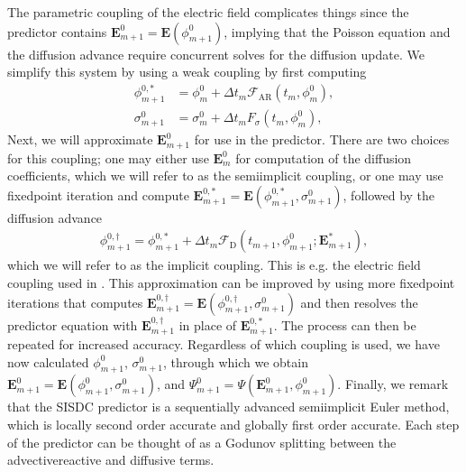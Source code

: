 \documentclass[letterpaper,10pt,english]{sphinxmanual}
\begin{document}
The parametric coupling of the electric field complicates things since the predictor contains \(\mathbf{E}_{m+1}^0 = \mathbf{E}\left(\phi_{m+1}^0\right)\), implying that the Poisson equation and the diffusion advance require concurrent solves for the diffusion update. We simplify this system by using a weak coupling by first computing
\begin{align}
\phi_{m+1}^{0,\ast} &= \phi_m^0 + \Delta t_m\mathcal{F}_{\textrm{AR}}\left(t_m, \phi_m^0\right), \\
\sigma_{m+1}^0 &= \sigma_m^0 + \Delta t_mF_\sigma\left(t_m, \phi_m^0\right),
\end{align}
Next, we will approximate \(\mathbf{E}_{m+1}^{0}\) for use in the predictor. There are two choices for this coupling; one may either use \(\mathbf{E}_m^0\) for computation of the diffusion coefficients, which we will refer to as the semi\sphinxhyphen{}implicit coupling, or one may use fixed\sphinxhyphen{}point iteration and compute \(\mathbf{E}_{m+1}^{0,\ast} = \mathbf{E}\left(\phi_{m+1}^{0, \ast}, \sigma_{m+1}^0\right)\), followed by the diffusion advance
\begin{equation*}
\begin{split}\phi_{m+1}^{0,\dagger} = \phi_{m+1}^{0,\ast} + \Delta t_m\mathcal{F}_{\textrm{D}}\left(t_{m+1}, \phi_{m+1}^0; \mathbf{E}_{m+1}^\ast\right),\end{split}
\end{equation*}
which we will refer to as the implicit coupling. This is e.g. the electric field coupling used in . This approximation can be improved by using more fixed\sphinxhyphen{}point iterations that computes \(\mathbf{E}_{m+1}^{0,\dagger} = \mathbf{E}\left(\phi_{m+1}^{0,\dagger}, \sigma_{m+1}^0\right)\) and then re\sphinxhyphen{}solves the predictor equation with \(\mathbf{E}_{m+1}^{0,\dagger}\) in place of \(\mathbf{E}_{m+1}^{0,\ast}\). The process can then be repeated for increased accuracy. Regardless of which coupling is used, we have now calculated \(\phi_{m+1}^0\), \(\sigma_{m+1}^0\), through which we obtain \(\mathbf{E}_{m+1}^0 = \mathbf{E}\left(\phi_{m+1}^0, \sigma_{m+1}^0\right)\), and \(\Psi_{m+1}^0 = \Psi\left(\mathbf{E}_{m+1}^0, \phi_{m+1}^0\right)\). Finally, we remark that the SISDC predictor is a sequentially advanced semi\sphinxhyphen{}implicit Euler method, which is locally second order accurate and globally first order accurate. Each step of the predictor can be thought of as a Godunov splitting between the advective\sphinxhyphen{}reactive and diffusive terms.
\end{document}
